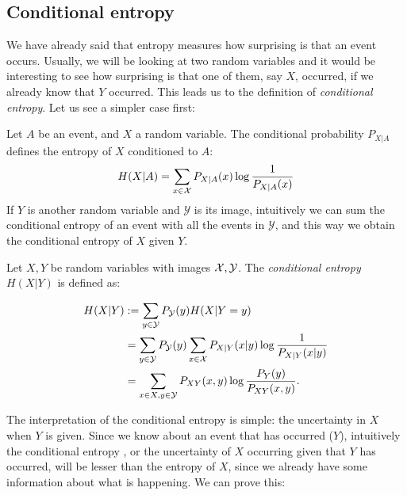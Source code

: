 \subsection*{Conditional entropy}
We have already said that entropy measures how surprising is that an event occurs.
Usually, we will be looking at two random variables and it would be interesting to see how surprising is that one of them, say $X$, occurred, if we already know that $Y$ occurred. 
This leads us to the definition of \emph{conditional entropy}. Let us see a simpler case first:

Let $A$ be an event, and $X$ a random variable. The conditional probability $P_{X|A}$ defines the entropy of $X$ conditioned to $ A$:
$$
H(X| A) = \sum_{x \in \mathcal{X}} P_{X|A}(x) \log\frac{1}{P_{X|A}(x)}
$$
If $Y$ is another random variable and $\mathcal Y$ is its image, intuitively we can sum the conditional entropy of an event with all the events in $\mathcal Y$, and this way we obtain the conditional entropy of $X$ given $Y$.
\begin{ndef}
Let $X,Y$ be random variables with images $\mathcal{X},\mathcal Y$. The \emph{conditional entropy} $H(X | Y)$ is defined as:

\begin{equation*}
        \begin{split}
    H(X|Y) &  :=   \sum_{y \in \mathcal Y} P_{\mathcal Y}(y) H(X| Y = y)  \\ 
    & = \sum_{y \in \mathcal Y} P_{\mathcal  Y}(y) \sum_{x \in \mathcal{X}} P_{X | Y}(x|y)\log\frac{1}{P_{X|Y}(x|y)}  \\
   & = \sum_{x \in X,y \in \mathcal Y}P_{XY}(x,y)\log\frac{P_Y(y)}{P_{XY}(x,y)}.
\end{split}
\end{equation*}



\end{ndef}

The interpretation of the conditional entropy is simple: the uncertainty in $X$ when $Y$ is given. Since we know about an event that has occurred ($Y$), intuitively the conditional entropy , or the uncertainty of $X$ occurring given that $Y$ has occurred, will be lesser than the entropy of $X$, since we already have some information about what is happening. We can prove this:

